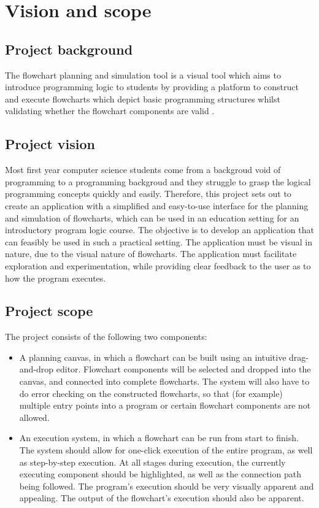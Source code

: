 \documentclass[12pt,a4paper,titlepage]{article}
\begin{document}


\newpage
\tableofcontents


\pagebreak

\section{Vision and scope}
\subsection{Project background}
The flowchart planning and simulation  tool is a visual tool which aims to introduce programming logic to students by providing  a platform to construct  and execute  flowcharts which depict basic programming structures whilst validating whether the flowchart components are valid .

\subsection{Project vision}

Most first year computer science students come from a backgroud void of programming to a programming backgroud 
and they struggle to grasp the logical programming concepts quickly and easily.
Therefore, this project sets out to create an application with a simplified and easy-to-use interface for the planning and simulation of flowcharts, which
can be used in an education setting for an introductory program logic course. The objective is to
develop an application that can feasibly be used in such a practical setting. The application must be
visual in nature, due to the visual nature of flowcharts. The application must facilitate exploration
and experimentation, while providing clear feedback to the user as to how the program executes.

\subsection{Project scope}

The project consists of the following two components:

\begin{itemize}
\item A planning canvas, in which a flowchart can be built using an intuitive drag-and-drop editor.
Flowchart components will be selected and dropped into the canvas, and connected into
complete flowcharts. The system will also have to do error checking on the constructed
flowcharts, so that (for example) multiple entry points into a program or certain flowchart
components are not allowed.
\item An execution system, in which a flowchart can be run from start to finish. The system
should allow for one-click execution of the entire program, as well as step-by-step
execution. At all stages during execution, the currently executing component should be
highlighted, as well as the connection path being followed. The program's execution should
be very visually apparent and appealing. The output of the flowchart's execution should also
be apparent.
\end{itemize}
\end{document}
